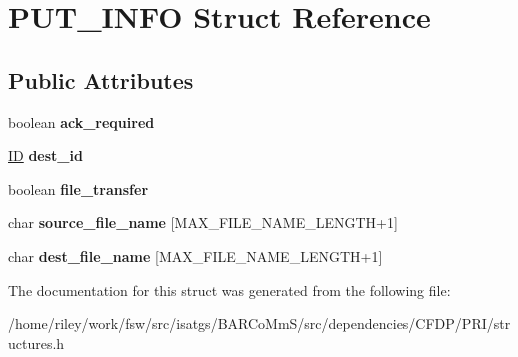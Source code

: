 \hypertarget{struct_p_u_t___i_n_f_o}{}\section{P\+U\+T\+\_\+\+I\+N\+FO Struct Reference}
\label{struct_p_u_t___i_n_f_o}
\subsection*{Public Attributes}
\begin{DoxyCompactItemize}
\item 
boolean {\bfseries ack\+\_\+required}\hypertarget{struct_p_u_t___i_n_f_o_a8d8458d6859cab3494bd8d75193cdba2}{}\label{struct_p_u_t___i_n_f_o_a8d8458d6859cab3494bd8d75193cdba2}

\item 
\hyperlink{struct_i_d}{ID} {\bfseries dest\+\_\+id}\hypertarget{struct_p_u_t___i_n_f_o_a6808d22b94b57c69105a09664eb0d7cc}{}\label{struct_p_u_t___i_n_f_o_a6808d22b94b57c69105a09664eb0d7cc}

\item 
boolean {\bfseries file\+\_\+transfer}\hypertarget{struct_p_u_t___i_n_f_o_a0f1fe47d2a56a42265ff65a6aa287467}{}\label{struct_p_u_t___i_n_f_o_a0f1fe47d2a56a42265ff65a6aa287467}

\item 
char {\bfseries source\+\_\+file\+\_\+name} \mbox{[}M\+A\+X\+\_\+\+F\+I\+L\+E\+\_\+\+N\+A\+M\+E\+\_\+\+L\+E\+N\+G\+TH+1\mbox{]}\hypertarget{struct_p_u_t___i_n_f_o_a324d49720dfd1891abb344bd89e90487}{}\label{struct_p_u_t___i_n_f_o_a324d49720dfd1891abb344bd89e90487}

\item 
char {\bfseries dest\+\_\+file\+\_\+name} \mbox{[}M\+A\+X\+\_\+\+F\+I\+L\+E\+\_\+\+N\+A\+M\+E\+\_\+\+L\+E\+N\+G\+TH+1\mbox{]}\hypertarget{struct_p_u_t___i_n_f_o_abad4d56f97566b50d27e3cb91265d558}{}\label{struct_p_u_t___i_n_f_o_abad4d56f97566b50d27e3cb91265d558}

\end{DoxyCompactItemize}


The documentation for this struct was generated from the following file\+:\begin{DoxyCompactItemize}
\item 
/home/riley/work/fsw/src/isatgs/\+B\+A\+R\+Co\+Mm\+S/src/dependencies/\+C\+F\+D\+P/\+P\+R\+I/structures.\+h\end{DoxyCompactItemize}
